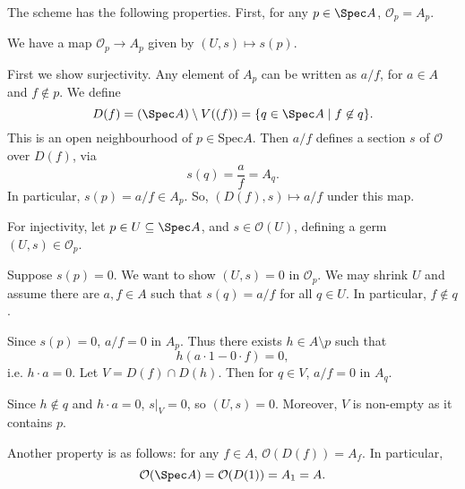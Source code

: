 \documentclass[12pt]{article}
\begin{document}

The scheme has the following properties. First, for any $p \in \Spec A$, $\mathcal{O}_p = A_p$.

\begin{proofbox}
	We have a map $\mathcal{O}_p \to A_p$ given by $(U, s) \mapsto s(p)$.

	First we show surjectivity. Any element of $A_p$ can be written as $a/f$, for $a \in A$ and $f \not \in p$. We define
	\[
		D(f) = (\Spec A) \setminus V((f)) = \{q \in \Spec A \mid f \not \in q\}.
	\]
	This is an open neighbourhood of $p \in \mathrm{Spec} A$. Then $a/f$ defines a section $s$ of $\mathcal{O}$ over $D(f)$, via
	\[
	s(q) = \frac{a}{f} = A_q.
	\]
	In particular, $s(p) = a/f \in A_p$. So, $(D(f), s) \mapsto a/f$ under this map.

	For injectivity, let $p \in U \subseteq \Spec A$, and $s \in \mathcal{O}(U)$, defining a germ $(U, s) \in \mathcal{O}_p$.

	Suppose $s(p) = 0$. We want to show $(U, s) = 0$ in $\mathcal{O}_p$. We may shrink $U$ and assume there are $a, f \in A$ such that $s(q)=  a/f$ for all $q \in U$. In particular, $f \not \in q$.

	Since $s(p) = 0$, $a/f = 0$ in $A_p$. Thus there exists $h \in A \setminus p$ such that
	\[
		h(a \cdot 1 - 0 \cdot f) = 0,
	\]
	i.e. $h \cdot a = 0$. Let $V = D(f) \cap D(h)$. Then for $q \in V$, $a/f = 0$ in $A_q$.

	Since $h \not \in q$ and $h \cdot a = 0$, $s|_V = 0$, so $(U, s) = 0$. Moreover, $V$ is non-empty as it contains $p$.
\end{proofbox}

Another property is as follows: for any $f \in A$, $\mathcal{O}(D(f)) = A_f$. In particular,
\[
\mathcal{O}(\Spec A) = \mathcal{O}(D(1)) = A_1 = A.
\]
\end{document}
